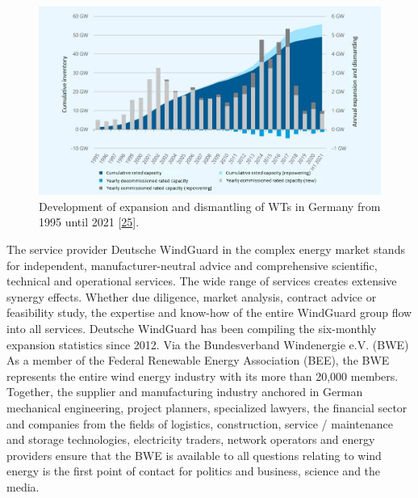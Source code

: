 \documentclass[a4paper,11pt]{article}
\begin{document}
\begin{figure}

{\centering \includegraphics[width=1\linewidth]{figures/wind2} 

}

\caption{Development of expansion and dismantling of WTs in Germany from 1995 until 2021 {[}\protect\hyperlink{ref-DeutscheWindGuard.2021}{25}{]}.}\label{fig:winddevelopment}
\end{figure}
The service provider Deutsche WindGuard in the complex energy market stands for independent, manufacturer-neutral advice and comprehensive scientific, technical and operational services. The wide range of services creates extensive synergy effects. Whether due diligence, market analysis, contract advice or feasibility study, the expertise and know-how of the entire WindGuard group flow into all services. Deutsche WindGuard has been compiling the six-monthly expansion statistics since 2012. Via the Bundesverband Windenergie e.V. (BWE) As a member of the Federal Renewable Energy Association (BEE), the BWE represents the entire wind energy industry with its more than 20,000 members. Together, the supplier and manufacturing industry anchored in German mechanical engineering, project planners, specialized lawyers, the financial sector and companies from the fields of logistics, construction, service / maintenance and storage technologies, electricity traders, network operators and energy providers ensure that the BWE is available to all questions relating to wind energy is the first point of contact for politics and business, science and the media.
\end{document}
